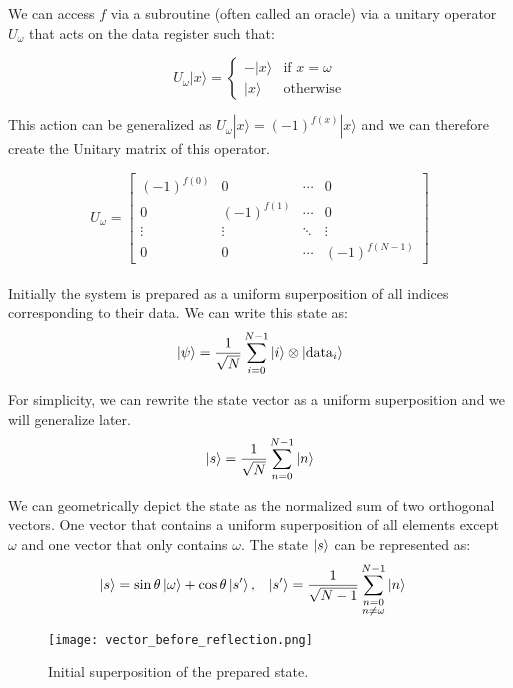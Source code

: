 \documentclass[12pt,a4paper]{report}
\begin{document}
\newpage

\noindent
We can access \( f \) via a subroutine (often called an oracle) via a unitary operator \( U_\omega \) that acts on the data register such that:

\[
U_\omega |x\rangle = 
\begin{cases} 
-|x\rangle & \text{if } x = \omega \\
|x\rangle & \text{otherwise}
\end{cases}
\]

\noindent
This action can be generalized as $U_\omega |x\rangle = (-1)^{f(x)} |x\rangle$ and we can therefore create the Unitary matrix of this operator.

\[
U_\omega = \left[
\begin{array}{cccccc}
(-1)^{f(0)} & 0 & \cdots & 0 \\
0 & (-1)^{f(1)} & \cdots & 0 \\
\vdots & \vdots & \ddots & \vdots \\
0 & 0 & \cdots & (-1)^{f(N-1)}
\end{array}
\right]
\]
\\

\noindent
Initially the system is prepared as a uniform superposition of all indices corresponding to their data. We can write this state as:
\[
\ket{\psi} = \frac{1}{\sqrt{N}} \sum_{i=0}^{N-1} \ket{i} \otimes \ket{\text{data}_i}
\]

\noindent
For simplicity, we can rewrite the state vector as a uniform superposition and we will generalize later.
\[
\ket{s} = \frac{1}{\sqrt{N}} \sum_{n=0}^{N-1} \ket{n}
\]

\noindent
We can geometrically depict the state as the normalized sum of two orthogonal vectors. One vector that contains a uniform superposition of all elements except $\omega$ and one vector that only contains $\omega$. The state $\ket{s}$ can be represented as:
\begin{align*}
\ket{s} &= \sin \theta \ket{\omega} + \cos \theta \ket{s'}, & \ket{s'} &= \frac{1}{\sqrt{N-1}} \sum_{\substack{n=0 \\ n \neq \omega}}^{N-1} \ket{n}
\end{align*}

\begin{figure}[!h]
    \centering
    \texttt{[image: vector\_before\_reflection.png]}
    \caption{Initial superposition of the prepared state.}
    \label{fig:grov_before_refl}
\end{figure}
\end{document}
